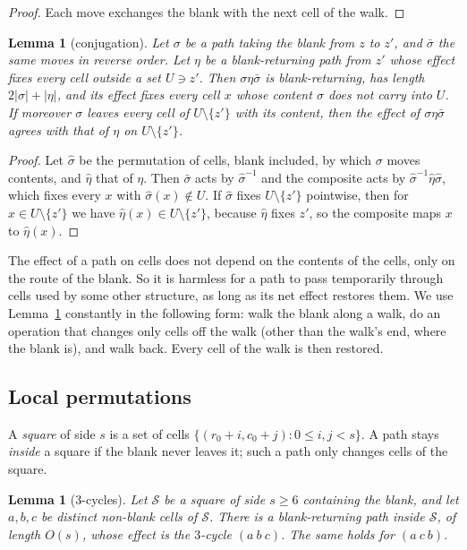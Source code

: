 \documentclass[11pt]{amsart}
\newtheorem{lemma}[theorem]{Lemma}
\theoremstyle{definition}
\begin{document}
\begin{proof}
Each move exchanges the blank with the next cell of the walk.
\end{proof}

\begin{lemma}[conjugation]\label{lem:conj}
Let $\sigma$ be a path taking the blank from $z$ to $z'$, and $\bar\sigma$ the same moves in reverse order.
Let $\eta$ be a blank-returning path from $z'$ whose effect fixes every cell outside a set $U\ni z'$. Then
$\sigma\eta\bar\sigma$ is blank-returning, has length $2|\sigma|+|\eta|$, and its effect fixes every cell $x$ whose
content $\sigma$ does not carry into $U$. If moreover $\sigma$ leaves every cell of $U\setminus\{z'\}$ with its content, then the
effect of $\sigma\eta\bar\sigma$ agrees with that of $\eta$ on $U\setminus\{z'\}$.
\end{lemma}

\begin{proof}
Let $\hat\sigma$ be the permutation of cells, blank included, by which $\sigma$ moves contents, and $\hat\eta$
that of $\eta$. Then $\bar\sigma$ acts by $\hat\sigma^{-1}$ and the composite acts by $\hat\sigma^{-1}\hat\eta\hat\sigma$,
which fixes every $x$ with $\hat\sigma(x)\notin U$. If $\hat\sigma$ fixes $U\setminus\{z'\}$ pointwise, then for $x\in U\setminus\{z'\}$
we have $\hat\eta(x)\in U\setminus\{z'\}$, because $\hat\eta$ fixes $z'$, so the composite maps $x$ to $\hat\eta(x)$.
\end{proof}

The effect of a path on cells does not depend on the contents of the cells, only on the route of the blank. So it is harmless
for a path to pass temporarily through cells used by some other structure, as long as its net effect restores them.
We use Lemma~\ref{lem:conj} constantly in the following form: walk the blank along a walk, do an operation
that changes only cells off the walk (other than the walk's end, where the blank is), and walk back. Every
cell of the walk is then restored.

\subsection{Local permutations}
A \emph{square} of side $s$ is a set of cells $\{(r_0+i,c_0+j):0\le i,j<s\}$.
A path stays \emph{inside} a square if the blank never leaves it; such a path
only changes cells of the square.

\begin{lemma}[$3$-cycles]\label{lem:three}
Let $\mathcal S$ be a square of side $s\ge 6$ containing the blank, and let $a,b,c$ be distinct
non-blank cells of $\mathcal S$. There is a blank-returning path inside $\mathcal S$, of length $O(s)$, whose
effect is the $3$-cycle $(a\ b\ c)$. The same holds for $(a\ c\ b)$.
\end{lemma}
\end{document}
